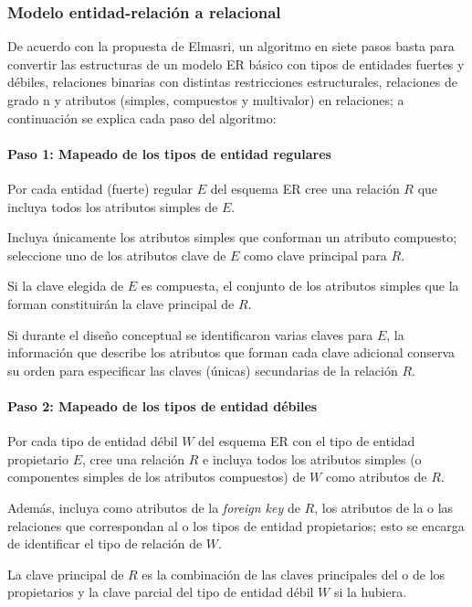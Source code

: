 \subsubsection{Modelo entidad-relación a relacional}
De acuerdo con la propuesta de Elmasri\cite{ramez_elmasri_fundamentos_nodate}, un algoritmo en siete pasos basta para convertir las estructuras de un modelo ER básico con tipos de entidades fuertes y débiles, relaciones binarias con distintas restricciones estructurales, relaciones de grado n y atributos (simples, compuestos y multivalor) en relaciones; a continuación se explica cada paso del algoritmo:

\paragraph*{Paso 1: Mapeado de los tipos de entidad regulares}
Por cada entidad (fuerte) regular $E$ del esquema ER cree una relación $R$ que incluya todos los atributos simples de $E$.


Incluya únicamente los atributos simples que conforman un atributo compuesto; seleccione uno de los atributos clave de $E$ como clave principal para $R$. 


Si la clave elegida de $E$ es compuesta, el conjunto de los atributos simples que la forman constituirán la clave principal de $R$.


Si durante el diseño conceptual se identificaron varias claves para $E$, la información que describe los atributos que forman cada clave adicional conserva su orden para especificar las claves (únicas) secundarias de la relación $R$. 

\paragraph*{Paso 2: Mapeado de los tipos de entidad débiles}
Por cada tipo de entidad débil $W$ del esquema ER con el tipo de entidad propietario $E$, cree una relación $R$ e incluya todos los atributos simples (o componentes simples de los atributos compuestos) de $W$ como atributos de $R$. 


Además, incluya como atributos de la \textit{foreign key} de $R$, los atributos de la o las relaciones que correspondan al o los tipos de entidad propietarios; esto se encarga de identificar el tipo de relación de $W$. 


La clave principal de $R$ es la combinación de las claves principales del o de los propietarios y la clave parcial del tipo de entidad débil $W$ si la hubiera.


